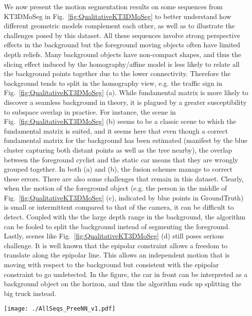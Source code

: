 \documentclass[10pt,twocolumn,letterpaper]{article}
\begin{document}
We now present the motion segmentation results on some sequences from KT3DMoSeg in Fig.~\ref{fig:QualitativeKT3DMoSeg} to better understand how different geometric models complement each other, as well as to illustrate the challenges posed by this dataset. All these sequences involve strong perspective effects in the background but the foreground moving objects often have limited depth reliefs. Many background objects have non-compact shapes, and thus the slicing effect induced by the homography/affine model is less likely to relate all the background points together due to the lower connectivity. Therefore the background tends to split in the homography view, e.g. the traffic sign in Fig.~\ref{fig:QualitativeKT3DMoSeg} (a). While fundamental matrix is more likely to discover a seamless background in theory, it is plagued by a greater susceptibility to subspace overlap in practice. For instance, the scene in Fig.~\ref{fig:QualitativeKT3DMoSeg} (b) seems to be a classic scene to which the fundamental matrix is suited, and it seems here that even though a correct fundamental matrix for the background has been estimated (manifest by the blue cluster capturing both distant points as well as the tree nearby), the overlap between the foreground cyclist and the static car means that they are wrongly grouped together. In both (a) and (b), the fusion schemes manage to correct these errors. There are also some challenges that remain in this dataset. Clearly, when the motion of the foreground object (e.g. the person in the middle of Fig.~\ref{fig:QualitativeKT3DMoSeg} (c), indicated by blue points in GroundTruth) is small or intermittent compared to that of the camera, it can be difficult to detect. Coupled with the the large depth range in the background, the algorithm can be fooled to split the background instead of segmenting the foreground. Lastly, scenes like Fig.~\ref{fig:QualitativeKT3DMoSeg} (d)  still poses serious challenge. It is well known that the epipolar constraint allows a freedom to translate along the epipolar line. This allows an independent motion that is moving with respect to the background but consistent with the epipolar constraint to go undetected. In the figure, the car in front can be interpreted as a background object on the horizon, and thus the algorithm ends up splitting the big truck instead.


\begin{figure*}[h]
\begin{center}
\texttt{[image: ./AllSeqs\_PreeNN\_v1.pdf]}
\caption{Examples of motion segmentation on KT3DMoSeg sequences.}\label{fig:QualitativeKT3DMoSeg}
\vspace{-0.6cm}
\end{center}
\end{figure*}
\end{document}
